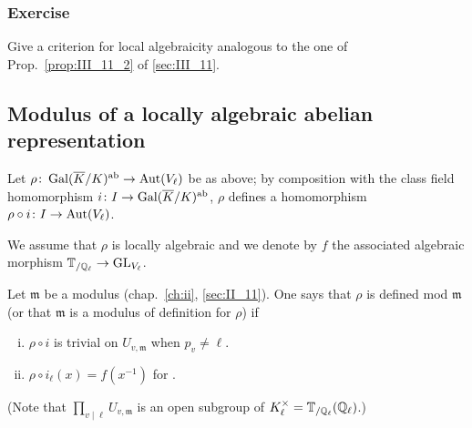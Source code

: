 \subsubsection*{Exercise}
Give a criterion for local algebraicity analogous to the one of
Prop.~\ref{prop:III_11_2} of \ref{sec:III_11}.

\subsection{Modulus of a locally algebraic abelian representation}
\label{sec:III_22}
Let $\rho\colon \operatorname{Gal}(\overline{K}/K)^{\mathrm{ab}} \to \operatorname{Aut}(V_\ell)$ be as above; by
composition with the class field homomorphism $i\colon I \to \operatorname{Gal}(\overline{K}/K)^{\mathrm{ab}}$, $\rho$ defines a homomorphism $\rho \circ i\colon I \to \operatorname{Aut}(V_\ell)$.

We assume that $\rho$ is locally algebraic and we denote by $f$ the associated
\dpage
algebraic morphism $\mathbb{T}_{/\mathbb{Q}_\ell} \to \operatorname{GL}_{V_\ell}$.
\begin{mydef}
Let $\mathfrak{m}$ be a modulus (chap.~\ref{ch:ii}, \ref{sec:II_11}).
One says that $\rho$ is defined mod $\mathfrak{m}$ (or that
$\mathfrak{m}$ is a modulus of definition for $\rho$) if
\begin{enumerate}[(i)]
	\item $\rho \circ i$ is trivial on $U_{v, \mathfrak{m}}$ when $p_v \ne
		\ell$.
	\item $\rho \circ i_\ell(x) = f(x^{-1})$ for .
\end{enumerate}
\end{mydef}
(Note that $\prod_{v\mid\ell} U_{v, \mathfrak{m}}$ is an open subgroup of
$K_\ell^\times = \mathbb{T}_{/\mathbb{Q}_\ell}(\mathbb{Q}_\ell)$.)

